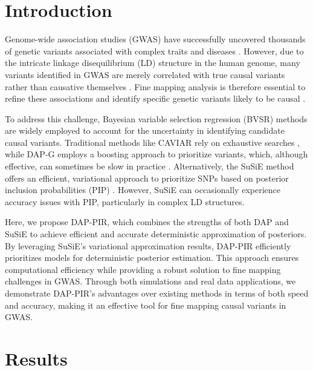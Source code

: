 \documentclass[pdflatex,sn-mathphys-num]{sn-jnl}%
\theoremstyle{thmstyleone}%
\theoremstyle{thmstyletwo}%
\theoremstyle{thmstylethree}%
\begin{document}
\section{Introduction}\label{sec1}
Genome-wide association studies (GWAS) have successfully uncovered thousands of genetic variants associated with complex traits and diseases \cite{visscher201710}. However, due to the intricate linkage disequilibrium (LD) structure in the human genome, many variants identified in GWAS are merely correlated with true causal variants rather than causative themselves \cite{ardlie2002patterns}. Fine mapping analysis is therefore essential to refine these associations and identify specific genetic variants likely to be causal \cite{spain2015strategies, schaid2018genome}.

To address this challenge, Bayesian variable selection regression (BVSR) methods are widely employed to account for the uncertainty in identifying candidate causal variants. Traditional methods like CAVIAR rely on exhaustive searches \cite{hormozdiari2014identifying}, while DAP-G employs a boosting approach to prioritize variants, which, although effective, can sometimes be slow in practice \cite{wen2016efficient, lee2018bayesian}. Alternatively, the SuSiE method offers an efficient, variational approach to prioritize SNPs based on posterior inclusion probabilities (PIP) \cite{wang2020simple}. However, SuSiE can occasionally experience accuracy issues with PIP, particularly in complex LD structures.

Here, we propose DAP-PIR, which combines the strengths of both DAP and SuSiE to achieve efficient and accurate deterministic approximation of posteriors. By leveraging SuSiE's variational approximation results, DAP-PIR efficiently prioritizes models for deterministic posterior estimation. This approach ensures computational efficiency while providing a robust solution to fine mapping challenges in GWAS. Through both simulations and real data applications, we demonstrate DAP-PIR’s advantages over existing methods in terms of both speed and accuracy, making it an effective tool for fine mapping causal variants in GWAS.



\section{Results}\label{sec2}
\end{document}
